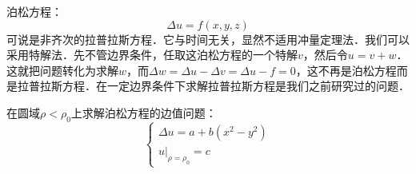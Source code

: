 

泊松方程：
\begin{equation}
\Delta u=f(x, y, z)
\end{equation}
可说是非齐次的拉普拉斯方程．它与时间无关，显然不适用冲量定理法．我们可以采用特解法．先不管边界条件，任取这泊松方程的一个特解$v$，然后令$u=v+w$．这就把问题转化为求解$w$，而$\Delta w=\Delta u-\Delta v=\Delta u-f=0$，这不再是泊松方程而是拉普拉斯方程．在一定边界条件下求解拉普拉斯方程是我们之前研究过的问题．

\begin{example}{}
在圆域$\rho<\rho_0$上求解泊松方程的边值问题：
\begin{equation}
\left\{\begin{array}{l}\Delta u=a+b\left(x^{2}-y^{2}\right) \\ \left.u\right|_{\rho=\rho_{0}}=c\end{array}\right.
\end{equation}


\end{example}
